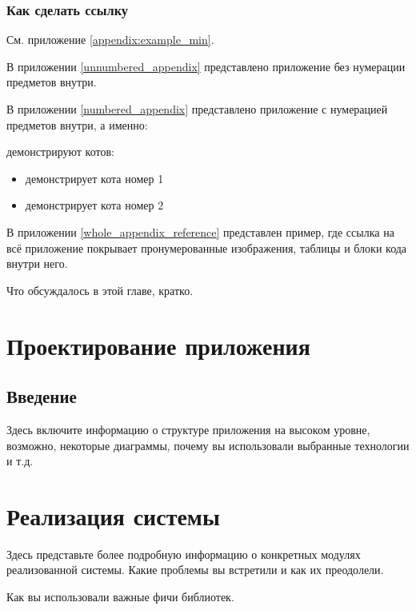 \documentclass[a4paper,12pt]{report}
\begin{document}
\subsection{Как сделать ссылку}

См. приложение \ref{appendix:example_min}.

В приложении \ref{unnumbered_appendix} представлено приложение без нумерации предметов внутри.

В приложении \ref{numbered_appendix} представлено приложение с нумерацией предметов внутри,
а именно:

 демонстрируют котов:
\begin{itemize}
  \item {} демонстрирует кота номер 1
  \item {} демонстрирует кота номер 2
\end{itemize}

В приложении \ref{whole_appendix_reference} представлен пример, где
ссылка на всё приложение покрывает пронумерованные изображения, таблицы и блоки кода внутри него.


Что обсуждалось в этой главе, кратко.

\chapter{Проектирование приложения}\label{architecture_chapter_title}

\section{Введение}

Здесь включите информацию о структуре приложения на высоком уровне,
возможно, некоторые диаграммы, почему вы использовали выбранные технологии и т.д.


\chapter{Реализация системы}\label{implementation_chapter_title}

Здесь представьте более подробную информацию о конкретных модулях реализованной системы.
Какие проблемы вы встретили и как их преодолели.

Как вы использовали важные фичи библиотек.
\end{document}
